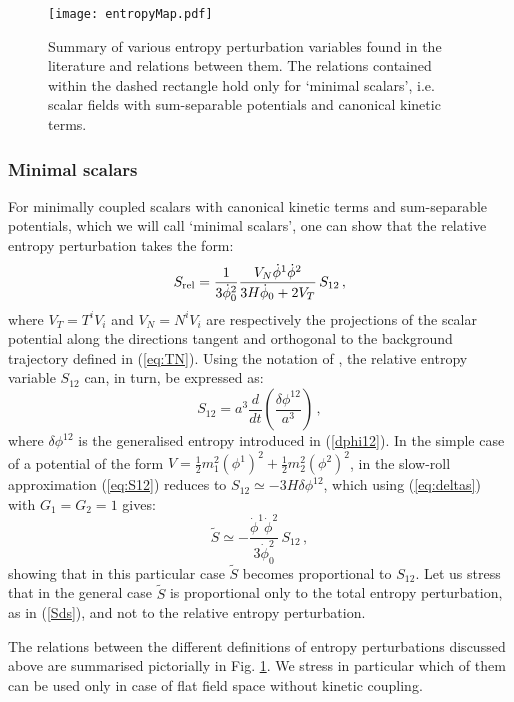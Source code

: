\documentclass[a4paper,11pt]{article}
\def\be{\begin{equation}}
\def\ee{\end{equation}}
\begin{document}
\begin{figure}[H]
\begin{center}
\texttt{[image: entropyMap.pdf]}
\caption{Summary of various entropy perturbation variables found in the literature and relations between them. The relations contained within the dashed rectangle hold only for `minimal scalars', i.e. scalar fields with sum-separable potentials and canonical kinetic terms.}
\label{fig:entropy}
\end{center}
\end{figure}


\subsubsection*{Minimal scalars}

For minimally coupled scalars with canonical kinetic terms and sum-separable potentials, which we will call `minimal scalars', one can show that the relative entropy perturbation takes the form:
\be
S_{\rm rel}=\frac{1}{3 \dot\phi_0^2} \frac{V_N \dot\phi^1 \dot\phi^2}{3 H \dot\phi_0+2 V_T }\,S_{12}\,,
\label{eq:Srel}
\ee
where $V_T=T^i V_i$ and $V_N=N^i V_i$ are respectively the projections of the scalar potential along the directions tangent and orthogonal to the background trajectory defined in (\ref{eq:TN}). Using the notation of \cite{Hwang:2000jh}, the relative entropy variable $S_{12}$ can, in turn, be expressed as:
\be
S_{12}=a^3 \frac{d}{d t }\left(\frac{\delta \phi^{12}}{a^3}\right)\,,
\label{eq:S12}
\ee
where $\delta \phi^{12}$ is the generalised entropy introduced in (\ref{dphi12}). In the simple case of a potential of the form $V = \frac12 m_1^2(\phi^1)^2 + \frac12 m_2^2(\phi^2)^2$, in the slow-roll approximation (\ref{eq:S12}) reduces to $S_{12}\simeq -3H \delta\phi^{12}$, which using (\ref{eq:deltas}) with $G_1=G_2=1$ gives:
\be
\tilde{S} \simeq -\frac{\dot{\phi}^1\dot{\phi}^2}{3\dot\phi_0^2}\,S_{12}\,,
\ee
showing that in this particular case $\tilde{S}$ becomes proportional to $S_{12}$. Let us stress that in the general case $\tilde S$ is proportional only to the total entropy perturbation, as in (\ref{Sds}), and not to the relative entropy perturbation. 

The relations between the different definitions of entropy perturbations discussed above are summarised pictorially in Fig. \ref{fig:entropy}. We stress in particular which of them can be used only in case of flat field space without kinetic coupling.
\end{document}
